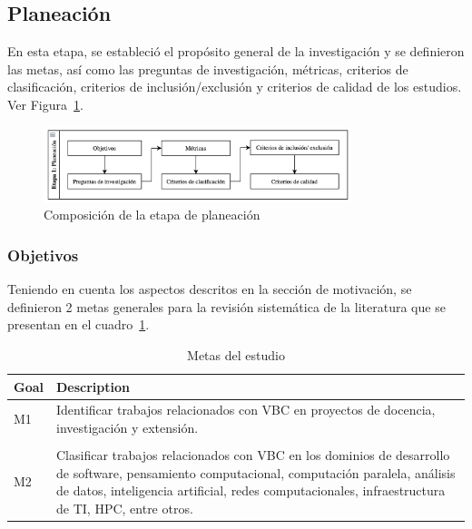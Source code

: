 \subsection{Planeación}

En esta etapa, se estableció el propósito general de la investigación y se definieron las metas, así como las preguntas de investigación, métricas, criterios de clasificación, criterios de inclusión/exclusión y criterios de calidad de los estudios. Ver Figura~\ref{fig:etapa1}.\\

\begin{figure}[htbp]
    \centering
    \includegraphics[width=0.8\textwidth]{resources/images/planeacion/etapa1.png}
    \caption{Composición de la etapa de planeación}\label{fig:etapa1}
\end{figure}
\subsubsection{Objetivos}
Teniendo en cuenta los aspectos descritos en la sección de motivación, se definieron 2 metas generales para la revisión sistemática de la literatura que se presentan en el cuadro~\ref{tab:metas}.

\begin{table}[H]
    \centering
    \begin{tabular}{>{\centering\arraybackslash}m{1cm} >{\arraybackslash}m{7cm}}
        \hline
        \textbf{Goal} & \textbf{Description} \\
        \hline
        M1 & Identificar trabajos relacionados con VBC en proyectos de docencia, investigación y extensión. \\
        \\
        M2 & Clasificar trabajos relacionados con VBC en los dominios de desarrollo de software, pensamiento computacional, computación paralela, análisis de datos, inteligencia artificial, redes computacionales, infraestructura de TI, HPC, entre otros. \\
        
        \hline
    \end{tabular}
    \caption{Metas del estudio}\label{tab:metas}
\end{table}

